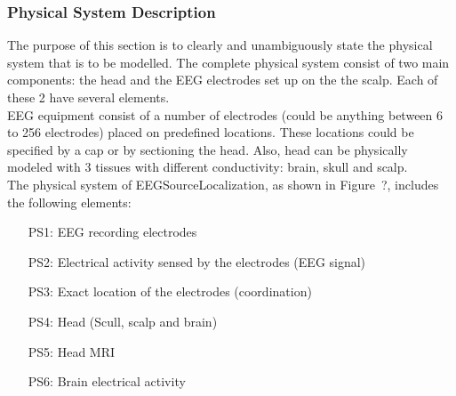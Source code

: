 \documentclass[12pt]{article}
\renewcommand{\progname}{EEGSourceLocalization}
\begin{document}
\subsubsection{Physical System Description} \label{sec_phySystDescrip}

The purpose of this section is to clearly and unambiguously state the physical system that is to be modelled. The complete physical system consist of two main components: the head and the EEG electrodes set up on the the scalp. Each of these 2 have several elements. \\

EEG equipment consist of a number of electrodes (could be anything between 6 to 256 electrodes) placed on predefined locations. These locations could be specified by a cap or by sectioning the head. Also, head can be physically modeled with 3 tissues with different conductivity: brain, skull and scalp. \\


The physical system of \progname{}, as shown in Figure~?,
includes the following elements:

\begin{itemize}

\item[PS1:] EEG recording electrodes
\item[PS2:] Electrical activity sensed by the electrodes (EEG signal)
\item[PS3:] Exact location of the electrodes (coordination)
\item[PS4:] Head (Scull, scalp and brain)
\item[PS5:] Head MRI
\item[PS6:] Brain electrical activity

\end{itemize}
\end{document}
